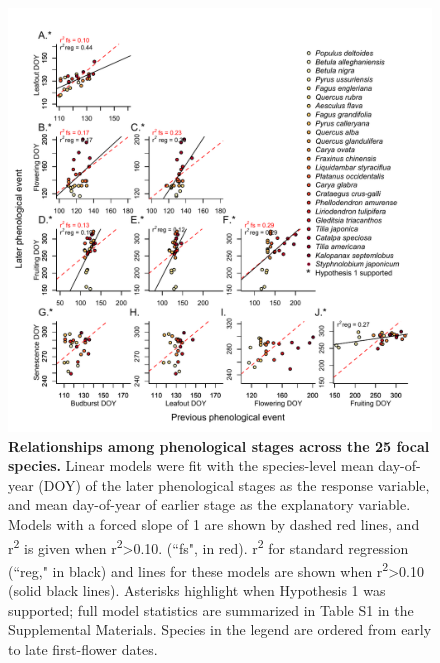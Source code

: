 \documentclass{article}
\begin{document}
 \begin{figure}[h]
 \centering
 \includegraphics{../analyses/figures/Hyp1_forcedslope_samerange2.pdf}
 \caption{\textbf{Relationships among phenological stages across the 25 focal species.} Linear models were fit with the species-level mean day-of-year (DOY) of the later phenological stages as the response variable, and mean day-of-year of earlier stage as the explanatory variable. Models with a forced slope of 1 are shown by dashed red lines, and r\textsuperscript{2} is given when r\textsuperscript{2}>0.10. (``fs", in red). r\textsuperscript{2} for standard regression (``reg," in black) and lines for these models are shown when r\textsuperscript{2}>0.10 (solid black lines). Asterisks highlight when Hypothesis 1 was supported; full model statistics are summarized in Table S1 in the Supplemental Materials. Species in the legend are ordered from early to late first-flower dates.} 
 \label{fig:latevearly}
\end{figure}
\end{document}
